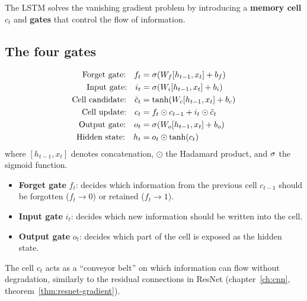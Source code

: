 The LSTM \cite{hochreiter1997long} solves the vanishing gradient problem by
introducing a \textbf{memory cell} $c_t$ and \textbf{gates} that control
the flow of information.

\subsection{The four gates}

\begin{keyformulas}[title=\textbf{LSTM equations}]
\begin{align}
\text{Forget gate:} \quad
f_t &= \sigma(W_f [h_{t-1}, x_t] + b_f)
\label{eq:lstm-forget} \\
\text{Input gate:} \quad
i_t &= \sigma(W_i [h_{t-1}, x_t] + b_i)
\label{eq:lstm-input} \\
\text{Cell candidate:} \quad
\tilde{c}_t &= \tanh(W_c [h_{t-1}, x_t] + b_c)
\label{eq:lstm-candidate} \\
\text{Cell update:} \quad
c_t &= f_t \odot c_{t-1} + i_t \odot \tilde{c}_t
\label{eq:lstm-cell} \\
\text{Output gate:} \quad
o_t &= \sigma(W_o [h_{t-1}, x_t] + b_o)
\label{eq:lstm-output-gate} \\
\text{Hidden state:} \quad
h_t &= o_t \odot \tanh(c_t)
\label{eq:lstm-hidden}
\end{align}
where $[h_{t-1}, x_t]$ denotes concatenation, $\odot$ the Hadamard product,
and $\sigma$ the sigmoid function.
\end{keyformulas}

\begin{intuition}[title=\textbf{Role of the gates}]
\begin{itemize}
  \item \textbf{Forget gate} $f_t$: decides which information from the
    previous cell $c_{t-1}$ should be forgotten ($f_t \to 0$) or
    retained ($f_t \to 1$).
  \item \textbf{Input gate} $i_t$: decides which new information
    should be written into the cell.
  \item \textbf{Output gate} $o_t$: decides which part of the cell
    is exposed as the hidden state.
\end{itemize}
The cell $c_t$ acts as a ``conveyor belt'' on which information can flow
without degradation, similarly to the residual connections in ResNet
(chapter~\ref{ch:cnn}, theorem~\ref{thm:resnet-gradient}).
\end{intuition}

